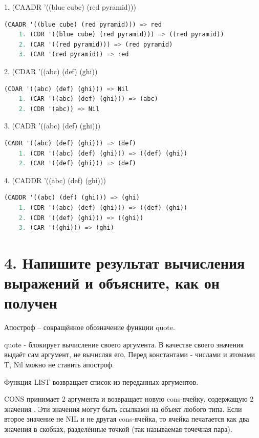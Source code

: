 \documentclass[12pt]{report}
\begin{document}
1. (CAADR '((blue cube) (red pyramid)))

\begin{lstlisting}[language=Lisp]
	(CAADR '((blue cube) (red pyramid))) => red
	1. (CDR '((blue cube) (red pyramid))) => ((red pyramid))
	2. (CAR '((red pyramid))) => (red pyramid)
	3. (CAR '(red pyramid)) => red
\end{lstlisting}

2. (CDAR '((abc) (def) (ghi))

\begin{lstlisting}[language=Lisp]
	(CDAR '((abc) (def) (ghi))) => Nil
	1. (CAR '((abc) (def) (ghi))) => (abc)
	2. (CDR '(abc)) => Nil
\end{lstlisting}

3. (CADR '((abc) (def) (ghi)))

\begin{lstlisting}[language=Lisp]
	(CADR '((abc) (def) (ghi))) => (def)
	1. (CDR '((abc) (def) (ghi))) => ((def) (ghi))
	2. (CAR '((def) (ghi))) => (def)
\end{lstlisting}


4. (CADDR '((abc) (def) (ghi)))

\begin{lstlisting}[language=Lisp]
	(CADDR '((abc) (def) (ghi))) => (ghi)
	1. (CDR '((abc) (def) (ghi))) => ((def) (ghi))
	2. (CDR '((def) (ghi))) => ((ghi))
	3. (CAR '((ghi))) => (ghi)
\end{lstlisting}


\section*{4. Напишите результат вычисления выражений и объясните, как он получен}

Апостроф – сокращённое обозначение функции quote.

quote - блокирует вычисление своего аргумента. В качестве своего значения выдаёт сам аргумент, не вычисляя его. Перед константами - числами и атомами T, Nil можно не ставить апостроф.

Функция LIST возвращает список из переданных аргументов. 

CONS принимает 2 аргумента и возвращает новую cons-ячейку, содержащую 2 значения . Эти значения могут быть ссылками на объект любого типа. Если второе значение не NIL и не другая cons-ячейка, то ячейка печатается как два значения в скобках, разделённые точкой (так называемая точечная пара).

	
\clearpage
\end{document}
